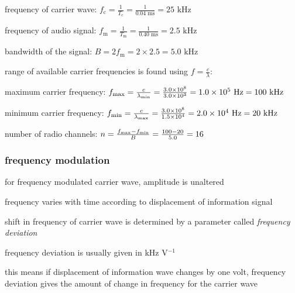 \sol frequency of carrier wave: $f_\text{c} = \frac{1}{T_\text{c}} = \frac{1}{0.04 \text{ ms}} = 25 \text{ kHz}$

\eqyskip frequency of audio signal: $f_\text{m} = \frac{1}{T_\text{m}} = \frac{1}{0.40 \text{ ms}} = 2.5 \text{ kHz}$
	
bandwidth of the signal: $B = 2 f_\text{m} = 2\times2.5 = 5.0 \text{ kHz}$

range of available carrier frequencies is found using $f=\frac{c}{\lambda}$:

maximum carrier frequency: $f_{\text{max}} = \frac{c}{\lambda_{\text{min}}} = \frac{3.0\times10^8}{3.0\times10^3} = 1.0\times10^5 \text{ Hz} = 100 \text{ kHz}$

minimum carrier frequency: $f_{\text{min}} = \frac{c}{\lambda_{\text{max}}} = \frac{3.0\times10^8}{1.5\times10^4} = 2.0\times10^4 \text{ Hz} = 20 \text{ kHz}$

\eqyskip number of radio channels: $n = \frac{f_{\text{max}} - f_{\text{min}}}{B} = \frac{100-20}{5.0} = 16$ \eoe



\subsubsection{frequency modulation}

for frequency modulated carrier wave, amplitude is unaltered

frequency varies with time according to displacement of information signal

\cmt shift in frequency of carrier wave is determined by a parameter called \emph{frequency deviation}

frequency deviation is usually given in kHz V$^{-1}$

this means if displacement of information wave changes by one volt, frequency deviation gives the amount of change in frequency for the carrier wave

